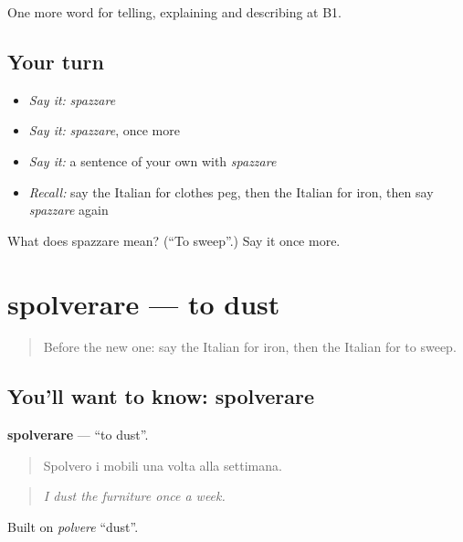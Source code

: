 \begin{grammarlens}[title={What you've built}]
One more word for telling, explaining and describing at B1.
\end{grammarlens}

\subsection*{Your turn}
\begin{itemize}
\raggedright
  \item \emph{Say it:} \emph{spazzare}
  \item \emph{Say it:} \emph{spazzare}, once more
  \item \emph{Say it:} a sentence of your own with \emph{spazzare}
  \item \emph{Recall:} say the Italian for clothes peg, then the Italian for iron, then say \emph{spazzare} again
\end{itemize}

\begin{tcolorbox}[breakable,colback=teal!4,colframe=teal!35!black,title={Before you move on}]
What does spazzare mean? (\textquotedblleft{}To sweep\textquotedblright{}.) Say it once more.
\end{tcolorbox}
\section[spolverare]{spolverare — to dust}

\label{lesson:IT-C532-spolverare}



\begin{quote}
Before the new one: say the Italian for iron, then the Italian for to sweep.
\end{quote}

\subsection*{You'll want to know: spolverare}
\textbf{spolverare} — \textquotedblleft{}to dust\textquotedblright{}.

\begin{quote}
Spolvero i mobili una volta alla settimana.
\end{quote}

\begin{quote}
\emph{I dust the furniture once a week.}
\end{quote}

Built on \emph{polvere} \textquotedblleft{}dust\textquotedblright{}.

